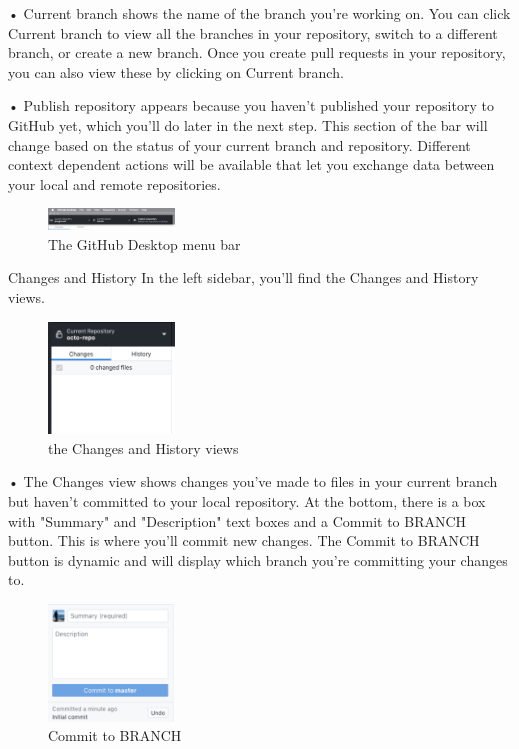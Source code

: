 •	Current branch shows the name of the branch you're working on. You can click Current branch to view all the branches in your repository, switch to a different branch, or create a new branch. Once you create pull requests in your repository, you can also view these by clicking on Current branch.

•	Publish repository appears because you haven't published your repository to GitHub yet, which you'll do later in the next step. This section of the bar will change based on the status of your current branch and repository. Different context dependent actions will be available that let you exchange data between your local and remote repositories.
\begin{figure}[ht]
    \centering
    \includegraphics[width=0.3\textwidth]{figures/The GitHub Desktop menu bar.png}
    \caption{The GitHub Desktop menu bar}
\end{figure}


Changes and History
In the left sidebar, you'll find the Changes and History views. 

\begin{figure}[ht]
    \centering
    \includegraphics[width=0.3\textwidth]{figures/the Changes and History views.png}
    \caption{the Changes and History views}
\end{figure}


•	The Changes view shows changes you've made to files in your current branch but haven't committed to your local repository. At the bottom, there is a box with "Summary" and "Description" text boxes and a Commit to BRANCH button. This is where you'll commit new changes. The Commit to BRANCH button is dynamic and will display which branch you're committing your changes to.  
\begin{figure}[ht]
    \centering
    \includegraphics[width=0.3\textwidth]{figures/Commit to BRANCH.png}
    \caption{Commit to BRANCH}
\end{figure}

